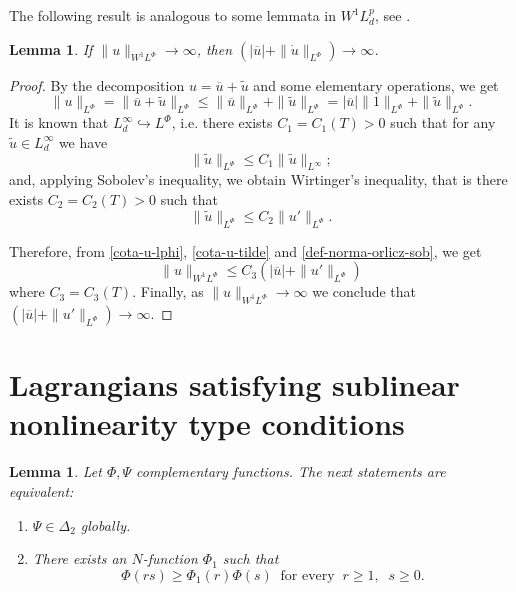 \documentclass[twoside]{article}
\newtheorem{lem}[thm]{Lemma}
\theoremstyle{remark}
\newcommand{\orlnor}{\|_{L^{\Phi}}}
\newcommand{\lphi}{L^{\Phi}}
\newcommand{\sobnor}{\|_{W^{1}\lphi}}
\renewcommand{\leq}{\leqslant}
\renewcommand{\geq}{\geqslant}
\begin{document}
The following result is analogous to some lemmata in $W^1L^p_d$, see \cite{xu2007some}.
\begin{lem}\label{infinito-a-prom-upunto}
If $\|u\sobnor\to \infty$, then $(|\overline{u}|+\|\dot{u}\orlnor)\to \infty$.
\end{lem}

\begin{proof}
By the decomposition $u=\overline{u}+\tilde{u}$ and some elementary operations,
we get
\begin{equation}\label{cota-u-lphi}
\|u\orlnor=
\|\overline{u}+\tilde{u}\orlnor\leq
\|\overline{u}\orlnor+\|\tilde{u}\orlnor=
|\overline{u}|\|1\orlnor+\|\tilde{u}\orlnor.
\end{equation}
It is known that $L^{\infty}_d\hookrightarrow\lphi$, i.e.
there exists $C_1=C_1(T)>0$ such that for any $\tilde{u}\in L^{\infty}_d$ we have
\[
\|\tilde{u}\orlnor
\leq 
C_1 \|\tilde{u}\|_{L^{\infty}};
\]
and, applying  Sobolev's inequality,  we obtain Wirtinger's inequality, that is there exists $C_2=C_2(T)>0$ such that 
\begin{equation}\label{cota-u-tilde}
\|\tilde{u}\orlnor
\leq 
C_2\|u'\orlnor.
\end{equation}

Therefore, from \eqref{cota-u-lphi}, \eqref{cota-u-tilde} and \eqref{def-norma-orlicz-sob}, 
we get
\[
\|u\sobnor\leq
C_3(|\overline{u}|+\|u'\orlnor)
\]
where $C_3=C_3(T)$. Finally, as $\|u\sobnor\to \infty$ we conclude that
$(|\overline{u}|+\|u'\orlnor)\to \infty$.
\end{proof}



\section{Lagrangians satisfying  sublinear nonlinearity type conditions}
\begin{lem}
Let $\Phi,\Psi$ complementary functions.
The next statements are equivalent:
\begin{enumerate}
\item\label{item1} $\Psi \in \Delta_2$ globally.
\item\label{item2} There exists an $N$-function $\Phi_1$ such that
\begin{equation}\label{eq:caract_delta2}
\Phi(rs)\geq \Phi_1(r)\Phi(s)\;\;\mbox{for every}\;\;r\geq1,\;\;s\geq 0.
\end{equation}
\end{enumerate}
\end{lem}
\end{document}
